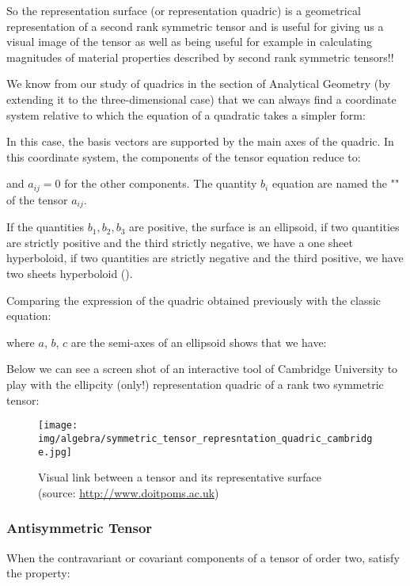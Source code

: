 	So the representation surface (or representation quadric) is a geometrical representation of a second rank symmetric tensor and is useful for giving us a visual image of the tensor as well as being useful for example in calculating magnitudes of material properties described by second rank symmetric tensors!!
	
	We know from our study of quadrics in the section of Analytical Geometry (by extending it to the three-dimensional case) that we can always find a coordinate system relative to which the equation of a quadratic takes a simpler form:
	
	In this case, the basis vectors are supported by the main axes of the quadric. In this coordinate system, the components of the tensor equation reduce to:
	
	and $a_{ij}=0$ for the other components. The quantity $b_i$ equation are named the "" of the tensor $a_{ij}$.

	If the quantities $b_1,b_2,b_3$ are positive, the surface is an ellipsoid, if two quantities are strictly positive and the third strictly negative, we have a one sheet hyperboloid, if two quantities are strictly negative and the third positive, we have two sheets hyperboloid ().
	
	Comparing the expression of the quadric obtained previously with the classic equation:
	
	where $a$, $b$, $c$ are the semi-axes of an ellipsoid shows that we have:
	
	Below we can see a screen shot of an interactive tool of Cambridge University to play with the ellipcity (only!) representation quadric of a rank two symmetric tensor:
	\begin{figure}[H]
		\centering
		\texttt{[image: img/algebra/symmetric\_tensor\_represntation\_quadric\_cambridge.jpg]}
		\caption[Visual link between a tensor and its representative surface]{Visual link between a tensor and its representative surface \\(source: \href{http://www.doitpoms.ac.uk/tlplib/tensors/representation.php}{http://www.doitpoms.ac.uk})}
	\end{figure}
	
	\subsubsection{Antisymmetric Tensor}
	When the contravariant or covariant components of a tensor of order two, satisfy the property:
	
